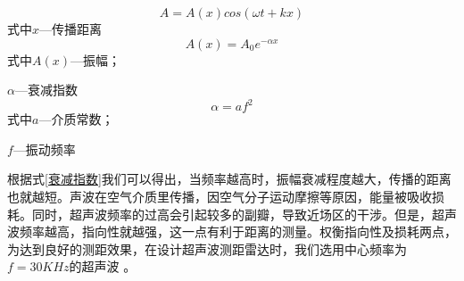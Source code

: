     \begin{equation}
    	A=A(x)cos(\omega t+kx)
    	\label{波动方程}
    \end{equation}
	式中\quad$x$---传播距离
	\begin{equation}
		A(x)=A_0 e^{-\alpha x}
		\label{振幅方程}
	\end{equation}
	式中\quad$A(x)$---振幅；\par
		\quad$\alpha$---衰减指数
	\begin{equation}
		\alpha=a f^2
		\label{衰减指数}
	\end{equation}
	式中\quad $a$---介质常数；\par
	   \quad $f$---振动频率\par
    根据式\ref{衰减指数}我们可以得出，当频率越高时，振幅衰减程度越大，传播的距离也就越短。声波在空气介质里传播，因空气分子运动摩擦等原因，能量被吸收损耗。同时，超声波频率的过高会引起较多的副瓣，导致近场区的干涉。但是，超声波频率越高，指向性就越强，这一点有利于距离的测量。权衡指向性及损耗两点，为达到良好的测距效果，在设计超声波测距雷达时，我们选用中心频率为$f=30KHz$的超声波 。
